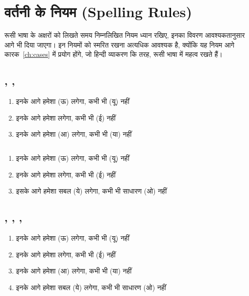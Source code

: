 \section{वर्तनी के नियम (Spelling Rules)}\label{sec:intro-spelling}
रूसी भाषा के अक्षरों को लिखते समय निम्नलिखित नियम ध्यान रखिए, इनका विवरण आवश्यकतानुसार आगे भी दिया जाएगा। इन नियमों
को स्मरित रखना अत्यधिक आवश्यक है, क्योंकि यह नियम आगे कारक~\ref{ch:cases} में प्रयोग होंगे, जो हिन्दी व्याकरण कि
तरह, रूसी भाषा में महत्व रखते हैं।~\cite{levine2009, robin2012, wade2011}

\subsection{, , }\label{subsec:alpha-spelling-k-g-h}
\begin{enumerate}
  \item इनके आगे हमेशा  (ऊ) लगेगा, कभी भी  (यू) नहीं
  \item इनके आगे हमेशा  लगेगा, कभी भी  (ई) नहीं
  \item इनके आगे हमेशा  (आ) लगेगा, कभी भी  (या) नहीं
\end{enumerate}

\subsection{}\label{subsec:alpha-spelling-ts}
\begin{enumerate}
  \item इनके आगे हमेशा  (ऊ) लगेगा, कभी भी  (यू) नहीं
  \item इनके आगे हमेशा  लगेगा, कभी भी  (ई) नहीं
  \item इसके आगे हमेशा सबल  (ये) लगेगा, कभी भी साधारण  (ओ) नहीं
\end{enumerate}

\subsection{, , , }\label{subsec:alpha-spelling-zh-ch-sh-scsh-ts}
\begin{enumerate}
  \item इनके आगे हमेशा  (ऊ) लगेगा, कभी भी  (यू) नहीं
  \item इनके आगे हमेशा  लगेगा, कभी भी  (ई) नहीं
  \item इनके आगे हमेशा  (आ) लगेगा, कभी भी  (या) नहीं
  \item इनके आगे हमेशा सबल  (ये) लगेगा, कभी भी साधारण  (ओ) नहीं
\end{enumerate}
